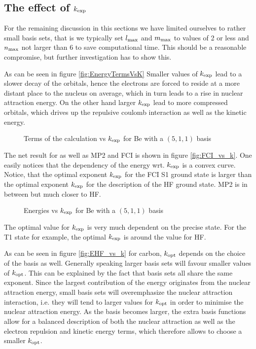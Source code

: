 \newcommand{\kopt}{\ensuremath k_\text{opt}}
\subsection{The effect of $k_\text{exp}$}
For the remaining discussion in this sections
we have limited ourselves to rather small basis sets,
that is we typically set $l_\text{max}$ and $m_\text{max}$ to values
of 2 or less and $n_\text{max}$ not larger than 6
to save computational time.
This should be a reasonable compromise,
but further investigation has to show this.

As can be seen in figure \vref{fig:EnergyTermsVsK}
Smaller values of $k_\text{exp}$ lead to a slower decay of the orbitals,
hence the electrons are forced to reside at a more
distant place to the nucleus on average,
which in turn leads to a rise in nuclear attraction energy.
On the other hand larger $k_\text{exp}$ lead to more compressed orbitals,
which drives up the repulsive coulomb interaction as well as the kinetic energy.

\begin{figure}
	\centering
	\caption{Terms of the \HF calculation vs $k_\text{exp}$ for Be with a $(5,1,1)$ \CS basis}
	\label{fig:EnergyTermsVsK}
\end{figure}

The net result for \HF as well as MP2 and FCI is shown in figure \vref{fig:FCI_vs_k}.
One easily notices that the dependency of the energy wrt. $k_\text{exp}$ is a
convex curve.
Notice, that the optimal exponent $k_\text{exp}$ for the FCI S1 ground state
is larger than the optimal exponent $k_\text{exp}$ for the description
of the HF ground state.
MP2 is in between but much closer to HF.

\begin{figure}
	\centering
	\caption{Energies vs $k_\text{exp}$ for Be with a $(5,1,1)$ \CS basis}
	\label{fig:FCI_vs_k}
\end{figure}

The optimal value for $k_\text{exp}$ is very much dependent on the
precise state.
For the T1 state for example, the optimal $k_\text{exp}$
is around the value for HF.

As can be seen in figure \vref{fig:EHF_vs_k}
for carbon,
$\kopt$ depends on the choice of the basis as well.
Generally speaking larger basis sets will favour
smaller values of $\kopt$.
This can be explained by the fact that \CS basis sets
all share the same exponent.
Since the largest contribution of the \HF energy
originates from the nuclear attraction energy,
small basis sets will overemphasize
the nuclear attraction interaction,
i.e. they will tend to larger values for $\kopt$
in order to minimise the nuclear attraction energy.
As the basis becomes larger,
the extra basis functions allow for a balanced
description of both the nuclear attraction
as well as the electron repulsion
and kinetic energy terms,
which therefore allows to choose a smaller $\kopt$.

